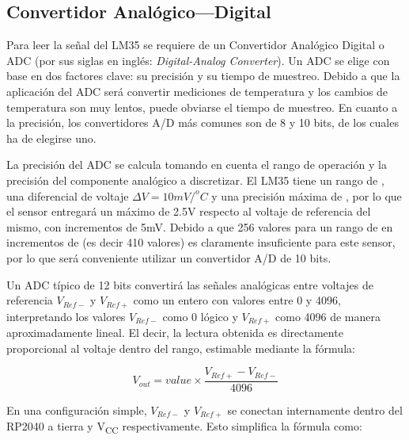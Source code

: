 %
%

\subsection{Convertidor Analógico---Digital}%
\label{sec:intro-adc}
Para leer la señal del LM35 se requiere de un Convertidor Analógico Digital o ADC (por sus siglas en inglés: \emph{Digital-Analog Converter}).
Un ADC se elige con base en dos factores clave: su precisión y su tiempo de muestreo.
Debido a que la aplicación del ADC será convertir mediciones de temperatura y los cambios de temperatura son muy lentos,\footnotemark{} puede obviarse el tiempo de muestreo.
En cuanto a la precisión, los convertidores A/D más comunes son de 8 y 10 bits, de los cuales ha de elegirse uno.

La precisión del ADC se calcula tomando en cuenta el rango de operación y la precisión del componente analógico a discretizar.
El LM35 tiene un rango de , una diferencial de voltaje $\Delta{}V=10mV/^{o}C$ y una precisión máxima de , por lo que el sensor entregará un máximo de 2.5V respecto al voltaje de referencia del mismo, con incrementos de 5mV.
Debido a que 256 valores para un rango de  en incrementos de  (es decir 410 valores) es claramente insuficiente para este sensor, por lo que será conveniente utilizar un convertidor A/D de 10 bits.

Un ADC típico de 12 bits convertirá las señales analógicas entre voltajes de referencia $V_{Ref-}$ y $V_{Ref+}$ como un entero con valores entre 0 y 4096, interpretando los valores $V_{Ref-}$ como 0 lógico y $V_{Ref+}$ como 4096 de manera aproximadamente lineal.
El decir, la lectura obtenida es directamente proporcional al voltaje dentro del rango, estimable mediante la fórmula:

\begin{equation}
V_{out}= value \times \frac{ V_{Ref+} - V_{Ref-} }{ 4096 }
\end{equation}

En una configuración simple, $V_{Ref-}$ y $V_{Ref+}$ se conectan internamente dentro del RP2040 a tierra y V\textsubscript{CC} respectivamente. Esto simplifica la fórmula como:

